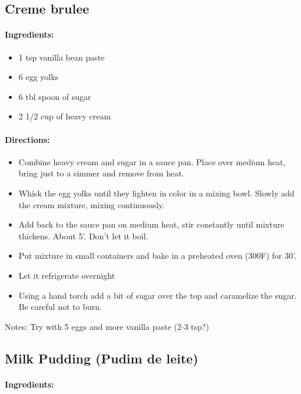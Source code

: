 \documentclass{article}
\begin{document}

\subsection{Creme brulee}

\paragraph{Ingredients:}

\begin{itemize}
\item 1 tsp vanilla bean paste
\item 6 egg yolks
\item 6 tbl spoon of sugar
\item 2 1/2 cup of heavy cream
\end{itemize}

\paragraph{Directions:}
\begin{itemize}
\item Combine heavy cream and sugar in a sauce pan. Place over medium heat, bring just to a simmer and remove from heat.

\item Whisk the egg yolks until they lighten in color in a mixing bowl. Slowly add the cream mixture, mixing continuously.
\item Add back to the sauce pan on medium heat, stir constantly until mixture thickens. About 5'. Don't let it boil.
\item Put mixture in small containers and bake in a preheated oven (300F) for 30'. 
\item Let it refrigerate overnight
\item Using a hand torch add a bit of sugar over the top and caramelize the sugar. Be careful not to burn.
\end{itemize}

Notes: Try with 5 eggs and more vanilla paste (2-3 tsp?)

\subsection{Milk Pudding (Pudim de leite)}

\paragraph{Ingredients:}
\end{document}
